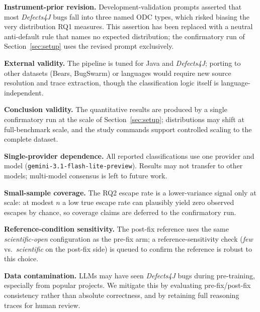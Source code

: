 \smallskip
\noindent\textbf{Instrument-prior revision.}\quad
Development-validation prompts asserted that most \textit{Defects4J} bugs fall
into three named ODC types, which risked biasing the very distribution RQ1
measures. This assertion has been replaced with a neutral anti-default rule
that names no expected distribution; the confirmatory run of
Section~\ref{sec:setup} uses the revised prompt exclusively.

\smallskip
\noindent\textbf{External validity.}\quad
The pipeline is tuned for Java and \textit{Defects4J}; porting to other datasets
(Bears, BugSwarm) or languages would require new source resolution and trace
extraction, though the classification logic itself is language-independent.

\smallskip
\noindent\textbf{Conclusion validity.}\quad
The quantitative results are produced by a single confirmatory run at the scale of
Section~\ref{sec:setup}; distributions may shift at full-benchmark scale, and the
study commands support controlled scaling to the complete dataset.

\smallskip
\noindent\textbf{Single-provider dependence.}\quad
All reported classifications use one provider and model
(\texttt{gemini-3.1-flash-lite-preview}). Results may not transfer to other
models; multi-model consensus is left to future work.

\smallskip
\noindent\textbf{Small-sample coverage.}\quad
The RQ2 escape rate is a lower-variance signal only at scale: at modest $n$ a low
true escape rate can plausibly yield zero observed escapes by chance, so coverage
claims are deferred to the confirmatory run.

\smallskip
\noindent\textbf{Reference-condition sensitivity.}\quad
The post-fix reference uses the same \textit{scientific-open} configuration as the
pre-fix arm; a reference-sensitivity check (\textit{few} vs.\ \textit{scientific}
on the post-fix side) is queued to confirm the reference is robust to this choice.

\smallskip
\noindent\textbf{Data contamination.}\quad
LLMs may have seen \textit{Defects4J} bugs during pre-training, especially from
popular projects. We mitigate this by evaluating pre-fix/post-fix consistency
rather than absolute correctness, and by retaining full reasoning traces for
human review.

